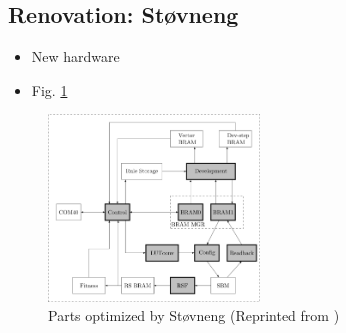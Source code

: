 \subsection{Renovation: Støvneng \cite{stovneng2014sblock}}

\begin{itemize}
    \item New hardware
    \item Fig. \ref{fig:ca-stovneng}
\end{itemize}

\begin{figure}[!ht]
    \centering
    \includegraphics[width=0.5\textwidth]{figures/ca-stovneng}
    \caption{Parts optimized by Støvneng (Reprinted from \cite{stovneng2014sblock})}
    \label{fig:ca-stovneng}
\end{figure}


